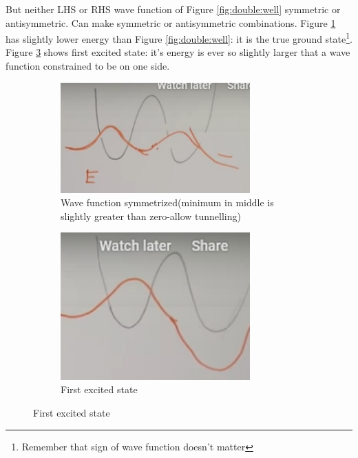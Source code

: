 \documentclass[]{article}
\begin{document}
But neither LHS or RHS wave function of Figure \ref{fig:double:well} symmetric or antisymmetric. Can make symmetric or antisymmetric combinations. Figure \ref{fig:double:well:symmetrized} has slightly lower energy than Figure \ref{fig:double:well}: it is the true ground state\footnote{Remember that sign of wave function doesn't matter}. Figure \ref{fig:double:well:1st} shows first excited state: it's energy is ever so slightly larger that a wave function constrained to be on one side.

\begin{figure}[H]
	\caption{Wave functions for Figure \ref{fig:double:well}}
	\begin{subfigure}{0.45\textwidth}
			\caption{Wave function symmetrized(minimum in middle is slightly greater than zero-allow tunnelling)}\label{fig:double:well:symmetrized}
			\includegraphics[width=0.8\textwidth]{particle_mixed_symmetrized}
	\end{subfigure}
	\begin{subfigure}{0.45\textwidth}
		\caption{First excited state}\label{fig:double:well:1st}
		\includegraphics[width=0.8\textwidth]{particle_mixed_1st_excited}
	\end{subfigure}
\end{figure}
\end{document}
